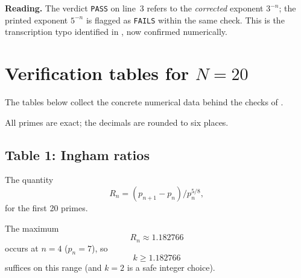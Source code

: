 \documentclass[11pt,reqno]{amsart}
\theoremstyle{redplain}
\numberwithin{equation}{section}
\begin{document}
\noindent\textbf{Reading.} The verdict \texttt{PASS} on line~3 refers to the 
\emph{corrected} exponent $3^{-n}$; the printed exponent $5^{-n}$ is flagged
as \texttt{FAILS} within the same check. This is the transcription typo
identified in , now confirmed numerically.


\section{Verification tables for $N=20$}

\label{sec:tables}

\noindent%
The tables below collect the concrete numerical data behind the checks of %
.

\noindent%
All primes are exact; the decimals are rounded to six places.

\subsection{Table 1: Ingham ratios}

\noindent%
The quantity 
\begin{equation}
R_{n}=(p_{n+1}-p_{n})/p_{n}^{5/8},
\end{equation}%
\noindent%
for the first 20 primes.

\noindent%
The maximum 
\begin{equation}
R_{n}\approx 1.182766
\end{equation}
occurs at $n=4$ ($p_{n}=7$), so%
\begin{equation}
k\geq 1.182766
\end{equation}
suffices on this range (and $k=2$ is a safe integer choice).
\end{document}
